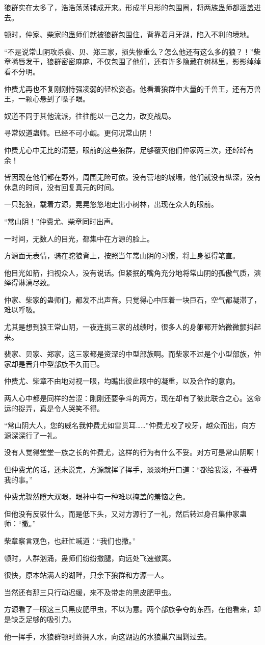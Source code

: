 \begin{this_body}
狼群实在太多了，浩浩荡荡铺成开来。形成半月形的包围圈，将两族蛊师都涵盖进去。

顿时，仲家、柴家的蛊师们就被狼群包围住，背靠着月牙湖，陷入不利的境地。

“不是说常山阴攻杀裴、贝、郑三家，损失惨重么？怎么他还有这么多的狼？！”柴章嘴唇发干，狼群密密麻麻，不仅包围了他们，还有许多隐藏在树林里，影影绰绰看不分明。

仲费尤再也不复刚刚恃强凌弱的轻松姿态。他看着狼群中大量的千兽王，还有万兽王，一颗心悬到了嗓子眼。

奴道不同于其他流派，往往能以一己之力，改变战局。

寻常奴道蛊师。已经不可小觑。更何况常山阴！

仲费尤心中无比的清楚，眼前的这些狼群，足够覆灭他们仲家两三次，还绰绰有余！

皆因现在他们都在野外，周围无险可依。没有营地的城墙，他们就没有纵深，没有休息的时间，没有回复真元的时间。

一只驼狼，载着方源，晃晃悠悠地走出小树林，出现在众人的眼前。

“常山阴！”仲费尤、柴章同时出声。

一时间，无数人的目光，都集中在方源的脸上。

方源面无表情，骑在驼狼背上，按照当年常山阴的习惯，将上身挺得笔直。

他目光如箭，扫视众人，没有说话。但紧抿的嘴角充分地将常山阴的孤傲气质，演绎得淋漓尽致。

仲家、柴家的蛊师们，都发不出声音。只觉得心中压着一块巨石，空气都凝滞了，难以呼吸。

尤其是想到狼王常山阴，一夜连挑三家的战绩时，很多人的身躯都开始微微颤抖起来。

裴家、贝家、郑家，这三家都是资深的中型部族啊。而柴家不过是个小型部族，仲家却是晋升中型部族不久而已。

仲费尤、柴章不由地对视一眼，均瞧出彼此眼中的凝重，以及合作的意向。

两人心中都是同样的苦涩：刚刚还要争斗的两方，现在却有了彼此联合之心。这命运的捉弄，真是令人哭笑不得。

“常山阴大人，您的威名我仲费尤如雷贯耳……”仲费尤咬了咬牙，越众而出，向方源深深行了一礼。

没有人觉得堂堂一族之长的仲费尤，这样的行为有什么不妥。对方可是常山阴啊！

但仲费尤的话，还未说完，方源就挥了挥手，淡淡地开口道：“都给我滚，不要碍我的事。”

仲费尤骤然瞪大双眼，眼神中有一种难以掩盖的羞恼之色。

但他没有反驳什么，而是低下头，又对方源行了一礼，然后转过身召集仲家蛊师：“撤。”

柴章察言观色，也赶忙喊道：“我们也撤。”

顿时，人群汹涌，蛊师们纷纷撒腿，向远处飞速撤离。

很快，原本站满人的湖畔，只余下狼群和方源一人。

当然还有那三只行动迟缓，来不及带走的黑皮肥甲虫。

方源看了一眼这三只黑皮肥甲虫，不以为意。两个部族争夺的东西，在他看来，却是缺乏足够的吸引力。

他一挥手，水狼群顿时蜂拥入水，向这湖边的水狼巢穴围剿过去。

\end{this_body}

